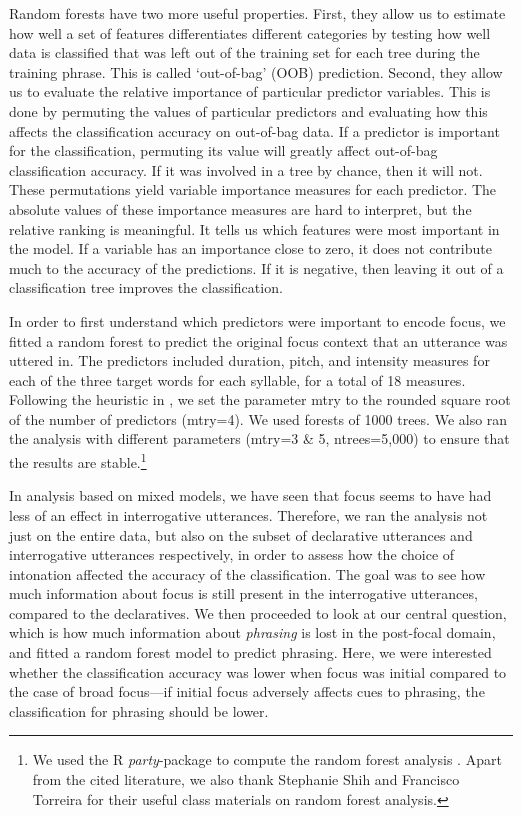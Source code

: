 \documentclass[preprint,review,12pt,authoryear,times]{elsarticle}
\begin{document}
Random forests have two more useful properties. First, they allow us to estimate how well a set of features differentiates different categories by testing how well data is classified that was left out of the training set for each tree during the training phrase. This is called `out-of-bag' (OOB) prediction. Second, they allow us to evaluate the relative importance of particular predictor variables. This is done by permuting the values of particular predictors and evaluating how this affects the classification accuracy on out-of-bag data. If a predictor is important for the classification, permuting its value will greatly affect out-of-bag classification accuracy. If it was involved in a tree by chance, then it will not. These permutations yield variable importance measures for each predictor. The absolute values of these importance measures are hard to interpret, but the relative ranking is meaningful. It tells us which features were most important in the model. If a variable has an importance close to zero, it does not contribute much to the accuracy of the predictions. If it is negative, then leaving it out of a classification tree improves the classification. 

In order to first understand which predictors were important to encode focus, we fitted a random forest to predict the original focus context that an utterance was uttered in. The predictors included duration, pitch, and intensity measures for each of the three target words for each syllable, for a total of 18 measures.  Following the heuristic in \citet{strob09}, we set the parameter mtry to the rounded square root of the number of predictors (mtry=4). We used forests of 1000 trees. We also ran the analysis with different parameters (mtry=3 \& 5, ntrees=5,000) to ensure that the results are stable.\footnote{We used the R {\em party}-package to compute the random forest analysis \citep{hotho06,strob07,strob08}. Apart from the cited literature, we also thank Stephanie Shih and Francisco Torreira for their useful class materials on random forest analysis.}

In analysis based on mixed models, we have seen that focus seems to have had less of an effect in interrogative utterances. Therefore, we ran the analysis not just on the entire data, but also on the subset of declarative utterances and interrogative utterances respectively, in order to assess how the choice of intonation affected the accuracy of the classification. The goal was to see how much information about  focus is still present in the interrogative utterances, compared to the declaratives. We then proceeded to look at our central question, which is how much information about {\em phrasing} is lost in the post-focal domain, and fitted a random forest model to predict phrasing. Here, we were interested whether the classification accuracy was lower when focus was initial compared to the case of broad focus---if initial focus adversely affects cues to phrasing, the classification for phrasing should be lower.
\end{document}
